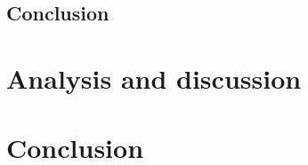\documentclass[a4paper,11pt]{article}
\begin{document}
\subsection{Conclusion} %
\label{sub:processing_conclusion}




\section{Analysis and discussion} %
\label{sec:analysis_and_discussion}



\section{Conclusion} %
\label{sec:conclusion}


\newpage



\end{document}
